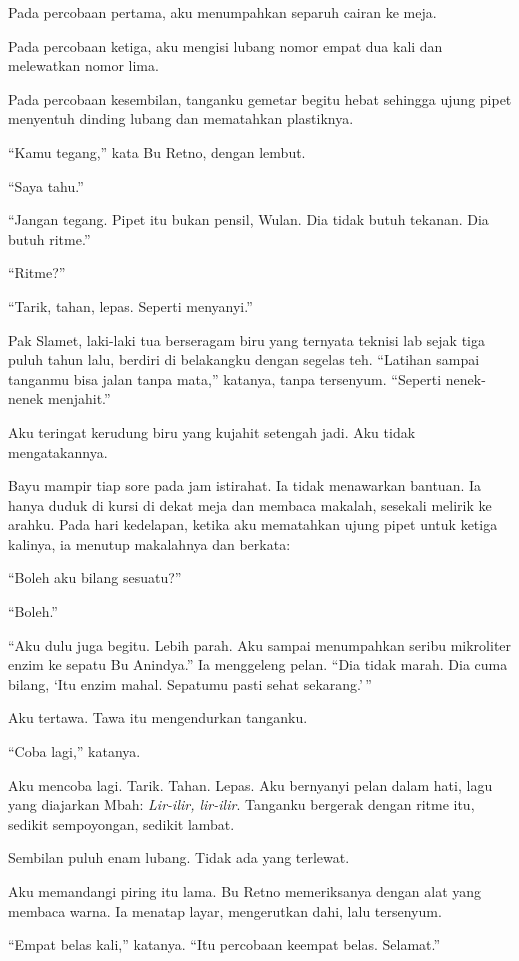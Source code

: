 \documentclass[11pt,twoside,openany]{book}
\begin{document}
Pada percobaan pertama, aku menumpahkan separuh cairan ke meja.

Pada percobaan ketiga, aku mengisi lubang nomor empat dua kali dan melewatkan nomor lima.

Pada percobaan kesembilan, tanganku gemetar begitu hebat sehingga ujung pipet menyentuh dinding lubang dan mematahkan plastiknya.

``Kamu tegang,'' kata Bu Retno, dengan lembut.

``Saya tahu.''

``Jangan tegang. Pipet itu bukan pensil, Wulan. Dia tidak butuh tekanan. Dia butuh ritme.''

``Ritme?''

``Tarik, tahan, lepas. Seperti menyanyi.''

Pak Slamet, laki-laki tua berseragam biru yang ternyata teknisi lab sejak tiga puluh tahun lalu, berdiri di belakangku dengan segelas teh. ``Latihan sampai tanganmu bisa jalan tanpa mata,'' katanya, tanpa tersenyum. ``Seperti nenek-nenek menjahit.''

Aku teringat kerudung biru yang kujahit setengah jadi. Aku tidak mengatakannya.

Bayu mampir tiap sore pada jam istirahat. Ia tidak menawarkan bantuan. Ia hanya duduk di kursi di dekat meja dan membaca makalah, sesekali melirik ke arahku. Pada hari kedelapan, ketika aku mematahkan ujung pipet untuk ketiga kalinya, ia menutup makalahnya dan berkata:

``Boleh aku bilang sesuatu?''

``Boleh.''

``Aku dulu juga begitu. Lebih parah. Aku sampai menumpahkan seribu mikroliter enzim ke sepatu Bu Anindya.'' Ia menggeleng pelan. ``Dia tidak marah. Dia cuma bilang, `Itu enzim mahal. Sepatumu pasti sehat sekarang.'\,''

Aku tertawa. Tawa itu mengendurkan tanganku.

``Coba lagi,'' katanya.

Aku mencoba lagi. Tarik. Tahan. Lepas. Aku bernyanyi pelan dalam hati, lagu yang diajarkan Mbah: \emph{Lir-ilir, lir-ilir}. Tanganku bergerak dengan ritme itu, sedikit sempoyongan, sedikit lambat.

Sembilan puluh enam lubang. Tidak ada yang terlewat.

Aku memandangi piring itu lama. Bu Retno memeriksanya dengan alat yang membaca warna. Ia menatap layar, mengerutkan dahi, lalu tersenyum.

``Empat belas kali,'' katanya. ``Itu percobaan keempat belas. Selamat.''
\end{document}
